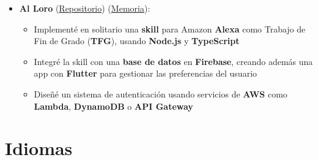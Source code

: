 \documentclass[letterpaper, 12pt, dvipsnames]{article}
\begin{document}
\begin{itemize}
    \item \textbf{Al Loro} (\href{https://github.com/algono/FeedTheParrot-RSS}{Repositorio}) (\href{http://hdl.handle.net/10251/174256}{Memoria}):
          \begin{itemize}
              \item Implementé en solitario una \textbf{skill} para Amazon \textbf{Alexa} como Trabajo de Fin de Grado (\textbf{TFG}), usando \textbf{Node.js} y \textbf{TypeScript}
              \item Integré la skill con una \textbf{base de datos} en \textbf{Firebase}, creando además una app con \textbf{Flutter} para gestionar las preferencias del usuario
              \item Diseñé un sistema de autenticación usando servicios de \textbf{AWS} como \textbf{Lambda}, \textbf{DynamoDB} o \textbf{API Gateway}
          \end{itemize}
\end{itemize}

\section*{Idiomas}
\end{document}
